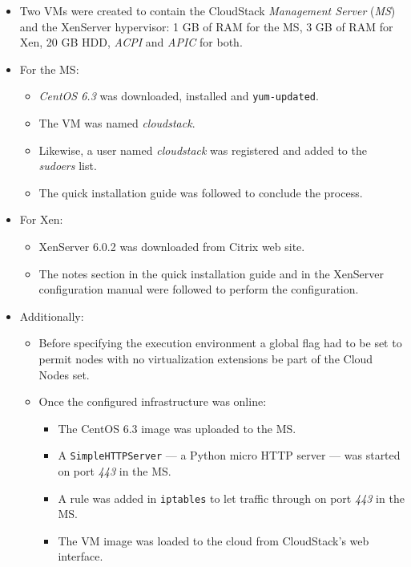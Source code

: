 \begin{itemize}
 \item Two VMs were created to contain the CloudStack \emph{Management Server} (\emph{MS}) and the XenServer hypervisor: 1 GB of RAM for the MS, 3 GB of RAM for Xen, 20 GB HDD, \emph{ACPI} and \emph{APIC} for both.
 \item For the MS:
  \begin{itemize}
   \item \emph{CentOS 6.3} was downloaded, installed and \texttt{yum-updated}.
   \item The VM was named \emph{cloudstack}.
   \item Likewise, a user named \emph{cloudstack} was registered and added to the \emph{sudoers} list.
   \item The quick installation guide was followed to conclude the process.
  \end{itemize}
 \item For Xen:
  \begin{itemize}
   \item XenServer 6.0.2 was downloaded from Citrix web site.
   \item The notes section in the quick installation guide and in the XenServer configuration manual \cite{xenserverinstall} were followed to perform the configuration.
  \end{itemize}
  \item Additionally:
   \begin{itemize}
    \item Before specifying the execution environment a global flag had to be set to permit nodes with no virtualization extensions \cite{cloudstacknohvm} be part of the Cloud Nodes set.
    \item Once the configured infrastructure was online:
     \begin{itemize}
      \item The CentOS 6.3 image was uploaded to the MS.
      \item A \texttt{SimpleHTTPServer} --- a Python micro HTTP server --- was started on port \emph{443} in the MS.
      \item A rule was added in \texttt{iptables} to let traffic through on port \emph{443} in the MS.
      \item The VM image was loaded to the cloud from CloudStack's web interface.
     \end{itemize}
   \end{itemize}
\end{itemize}

